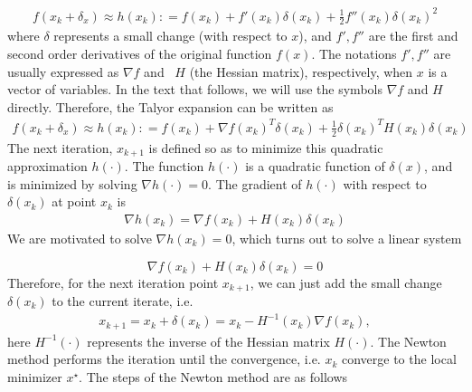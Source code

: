 \documentclass  [
  paper    = a4,
  BCOR     = 10mm,
  twoside,
  fontsize = 12pt,
  fleqn,
  toc      = bibnumbered,
  toc      = listofnumbered,
  numbers  = noendperiod,
  headings = normal,
  listof   = leveldown,
  version  = 3.03
]                                       {scrreprt}
\newcommand{\<}{\langle}
\renewcommand{\>}{\rangle}
\begin{document}
\begin{align*}
	f(x_k + \delta_x) \approx h(x_k) : = f(x_k) + f'(x_k)\delta(x_k) +\frac{1}{2}f''(x_k)\delta(x_k)^2 
\end{align*}
where $\delta$ represents a small change (with respect to $x$), and $f', f''$ are the first and second order derivatives of the original function $f(x)$. The notations $f', f''$ are usually expressed as $\nabla f$ and  $H$ (the Hessian matrix), respectively, when $x$ is a vector of variables. In the text that follows, we will use the symbols $\nabla f$ and $H$ directly. Therefore, the Talyor expansion can be written as 
\begin{align*}
	f(x_k + \delta_x) \approx h(x_k) : = f(x_k) + \nabla f(x_k)^T\delta(x_k) +\frac{1}{2}\delta(x_k) ^TH(x_k)\delta(x_k) 
\end{align*}
The next iteration, $x_{k+1}$ is defined so as to minimize this quadratic approximation $h(\cdot)$. The function $h(\cdot)$ is a quadratic function of $\delta(x)$, and is minimized by solving $\nabla h(\cdot) = 0$. The gradient of $h(\cdot)$ with respect to $\delta(x_k)$ at point $x_k$ is
\begin{align*}
	\nabla h(x_k) = \nabla f(x_k) + H(x_k) \delta(x_k) 
\end{align*}
We are motivated to solve $\nabla h(x_k) =0$, which turns out to solve a linear system

\begin{equation}
	\nabla f(x_k) + H(x_k) \delta(x_k) =0
	\label{HessianEq}
\end{equation}
Therefore, for the next iteration point $x_{k+1}$, we can just add the small change $\delta(x_k)$ to the current iterate, i.e. 
\begin{align*}
	x_{k+1}  = x_k + \delta(x_k) = x_k - H^{-1}(x_k)\nabla f(x_k), 
\end{align*}
here $ H^{-1}(\cdot)$ represents the inverse of the Hessian matrix $H(\cdot)$. The Newton method performs the iteration until the convergence, i.e. $x_k$ converge to the local minimizer $x^\star$. The steps of the Newton method are as follows
\end{document}

